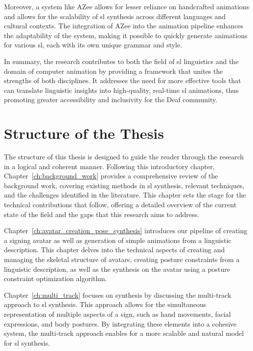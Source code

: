\documentclass[../../main.tex]{subfiles}
\begin{document}
Moreover, a system like AZee allows for lesser reliance on handcrafted animations and allows for the scalability of \gls{sl} synthesis across different languages and cultural contexts. The integration of AZee into the animation pipeline enhances the adaptability of the system, making it possible to quickly generate animations for various \gls{sl}, each with its own unique grammar and style.

In summary, the research contributes to both the field of \gls{sl} linguistics and the domain of computer animation by providing a framework that unites the strengths of both disciplines. It addresses the need for more effective tools that can translate linguistic insights into high-quality, real-time \gls{sl} animations, thus promoting greater accessibility and inclusivity for the Deaf community.

\section{Structure of the Thesis}
\label{ch:introduction:structure}

The structure of this thesis is designed to guide the reader through the research in a logical and coherent manner. Following this introductory chapter, Chapter~\ref{ch:background_work} provides a comprehensive review of the background work, covering existing methods in \gls{sl} synthesis, relevant techniques, and the challenges identified in the literature. This chapter sets the stage for the technical contributions that follow, offering a detailed overview of the current state of the field and the gaps that this research aims to address.

Chapter~\ref{ch:avatar_creation_pose_synthesis} introduces our pipeline of creating a signing avatar as well as generation of simple animations from a linguistic description. This chapter delves into the technical aspects of creating and managing the skeletal structure of avatars, creating posture constraints from a linguistic description, as well as the synthesis on the avatar using a posture constraint optimization algorithm.

Chapter~\ref{ch:multi_track} focuses on synthesis by discussing the multi-track approach to \gls{sl} synthesis. This approach allows for the simultaneous representation of multiple aspects of a sign, such as hand movements, facial expressions, and body postures. By integrating these elements into a cohesive system, the multi-track approach enables for a more scalable and natural model for \gls{sl} synthesis. 
\end{document}
